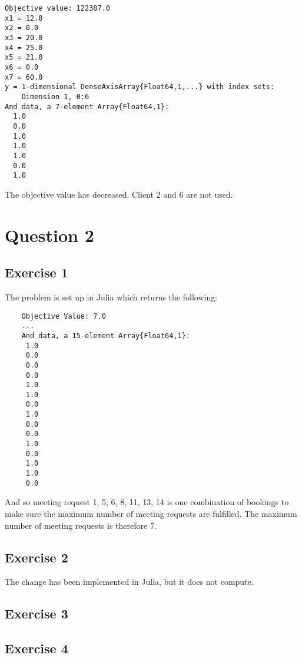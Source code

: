 \documentclass{article}
\begin{document}
\begin{commandline}
  \begin{verbatim}
Objective value: 122387.0
x1 = 12.0
x2 = 0.0
x3 = 20.0
x4 = 25.0
x5 = 21.0
x6 = 0.0
x7 = 60.0
y = 1-dimensional DenseAxisArray{Float64,1,...} with index sets:
    Dimension 1, 0:6
And data, a 7-element Array{Float64,1}:      
  1.0
  0.0
  1.0
  1.0
  1.0
  0.0
  1.0
    \end{verbatim}
  \end{commandline}

The objective value has decreased. Client 2 and 6 are not used.

\section{Question 2}
\subsection{Exercise 1}

The problem is set up in Julia which returns the following:

\begin{commandline}
  \begin{verbatim}
    Objective Value: 7.0
    ...
    And data, a 15-element Array{Float64,1}:     
     1.0
     0.0
     0.0
     0.0
     1.0
     1.0
     0.0
     1.0
     0.0
     0.0
     1.0
     0.0
     1.0
     1.0
     0.0
    \end{verbatim}
  \end{commandline}

And so meeting request 1, 5, 6, 8, 11, 13, 14 is one combination of bookings to make sure the maximum number of meeting requests are fulfilled.
The maximum number of meeting requests is therefore 7.

\subsection{Exercise 2}
The change has been implemented in Julia, but it does not compute.

\subsection{Exercise 3}

\subsection{Exercise 4}
\end{document}
